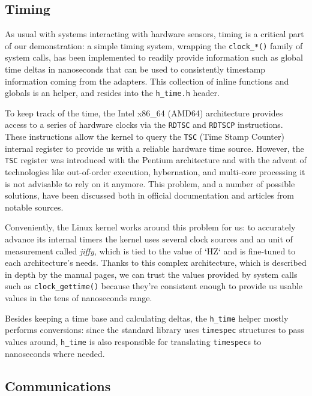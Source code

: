 \documentclass[a4paper,12pt]{report}
\begin{document}
\subsection{Timing}

As usual with systems interacting with hardware sensors, timing is a critical part of our demonstration: a simple timing system, wrapping the \texttt{clock\_*()} family of system calls, has been implemented to readily provide information such as global time deltas in nanoseconds that can be used to consistently timestamp information coming from the adapters. This collection of inline functions and globals is an helper, and resides into the \texttt{h\_time.h} header. 

To keep track of the time, the Intel x86\_64 (AMD64) architecture provides access to a series of hardware clocks via the \texttt{RDTSC} and \texttt{RDTSCP} instructions. These instructions allow the kernel to query the \texttt{TSC} (Time Stamp Counter) internal register to provide us with a reliable hardware time source. However, the \texttt{TSC} register was introduced with the Pentium architecture and with the advent of technologies like out-of-order execution, hybernation, and multi-core processing it is not advisable to rely on it anymore. This problem, and a number of possible solutions, have been discussed both in official documentation\cite{intel-rdtsc-bench} and articles from notable sources\cite{ms-rdtsc-issues}.

Conveniently, the Linux kernel works around this problem for us: to accurately advance its internal timers the kernel uses several clock sources and an unit of measurement called \textit{jiffy}, which is tied to the value of `HZ` and is fine-tuned to each architecture's needs\cite{elinux-hrts}. Thanks to this complex architecture, which is described in depth by the manual pages\cite{man-clock-getres-2}, we can trust the values provided by system calls such as \texttt{clock\_gettime()} because they're consistent enough to provide us usable values in the tens of nanoseconds range.

Besides keeping a time base and calculating deltas, the \texttt{h\_time} helper mostly performs conversions: since the standard library uses \texttt{timespec} structures to pass values around, \texttt{h\_time} is also responsible for translating \texttt{timespec}s to nanoseconds where needed.  

\subsection{Communications}
\end{document}
